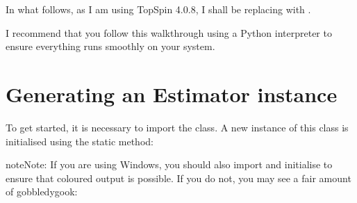 \documentclass[letterpaper,10pt,english]{sphinxmanual}
\begin{document}
\sphinxAtStartPar
In what follows, as I am using TopSpin 4.0.8, I shall be replacing
 with .

\sphinxAtStartPar
I recommend that you follow this walkthrough using a Python
interpreter to ensure everything runs smoothly on your system.


\section{Generating an Estimator instance}
\label{\detokenize{walkthrough:generating-an-estimator-instance}}
\sphinxAtStartPar
To get started, it is necessary to import the {\hyperref[\detokenize{references/core:nmrespy.core.Estimator}]{}}
class. A new instance of this class is initialised using the static
{\hyperref[\detokenize{references/core:nmrespy.core.Estimator.new_bruker}]{}} method:

\begin{sphinxVerbatim}[commandchars=\\\{\}]
   
  
  
\end{sphinxVerbatim}

\begin{sphinxadmonition}{note}{Note:}
\sphinxAtStartPar
If you are using Windows, you should also import and initialise 
to ensure that coloured output is possible. If you do not, you may see a
fair amount of gobbledygook:

\begin{sphinxVerbatim}[commandchars=\\\{\}]
 
\end{sphinxVerbatim}
\end{sphinxadmonition}
\end{document}
